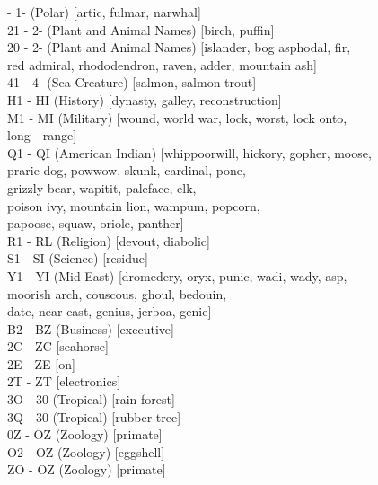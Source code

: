  - 1- (Polar)           [artic, fulmar, narwhal] \\
21 - 2- (Plant and Animal Names)   [birch, puffin] \\
20 - 2- (Plant and Animal Names)   [islander, bog asphodal, fir,  \\
                 red admiral, rhododendron, raven, adder, mountain ash] \\
41 - 4- (Sea Creature)    [salmon, salmon trout] \\
H1 - HI (History)         [dynasty, galley, reconstruction] \\
M1 - MI (Military)        [wound, world war, lock, worst, lock onto,  \\
                           long - range] \\
Q1 - QI (American Indian) [whippoorwill, hickory, gopher, moose, \\
                           prarie dog, powwow, skunk, cardinal, pone,  \\
                           grizzly bear, wapitit, paleface, elk,  \\
                           poison ivy, mountain lion, wampum, popcorn, \\
                           papoose, squaw, oriole, panther] \\
R1 - RL (Religion)        [devout, diabolic] \\
S1 - SI (Science)         [residue] \\
Y1 - YI (Mid-East)        [dromedery, oryx, punic, wadi, wady, asp, \\
                           moorish arch, couscous, ghoul, bedouin, \\
                           date, near east, genius, jerboa, genie] \\

\noindent
B2 - BZ (Business)        [executive] \\
2C - ZC                   [seahorse] \\
2E - ZE                   [on] \\
2T - ZT                   [electronics] \\

\noindent
3O - 30 (Tropical)        [rain forest] \\
3Q - 30 (Tropical)        [rubber tree] \\
0Z - OZ (Zoology)         [primate] \\
O2 - OZ (Zoology)         [eggshell] \\
ZO - OZ (Zoology)         [primate] \\


